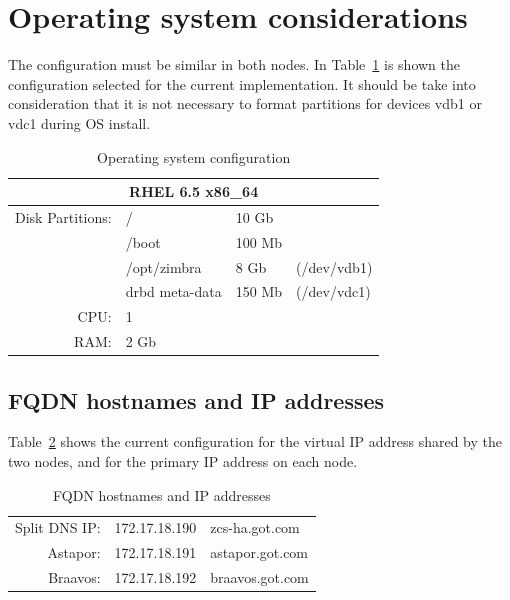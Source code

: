 \documentclass[a4paper, 12pt]{book}
\begin{document}
\section{Operating system considerations}
\label{sec:considerations}

The configuration must be similar in both nodes. In Table~\ref{table:os} is shown the configuration selected for the current implementation. It should be take into consideration that it is not necessary to format partitions for devices vdb1 or vdc1 during OS install.

\FloatBarrier
\begin{table}[H]
  \centering
  \begin{tabular}{ | r l l l | }
  
    \hline    
    \multicolumn{4}{|c|}{\textbf{RHEL 6.5 x86\_64}}\\
    \hline
    Disk Partitions: & /              & 10 Gb  & \\
                     & /boot          & 100 Mb & \\
                     & /opt/zimbra    & 8 Gb   & (/dev/vdb1)\\
                     & drbd meta-data & 150 Mb & (/dev/vdc1)\\
    CPU:             & 1              &        & \\
    RAM:			 & 2 Gb 		  &        & \\
    \hline
  \end{tabular}
\caption{Operating system configuration}
\label{table:os}
\end{table}


\subsection{FQDN hostnames and IP addresses}
\label{sec:fqdn}

Table~\ref{table:fqdn} shows the current configuration for the virtual IP address shared by the two nodes, and for the primary IP address on each node.

\FloatBarrier
\begin{table}[H]
  \centering
  \begin{tabular}{ | r c l | }
    \hline    
    Split DNS IP: & 172.17.18.190 & zcs-ha.got.com \\
	Astapor:      & 172.17.18.191 & astapor.got.com \\
	Braavos:      & 172.17.18.192 & braavos.got.com \\
    \hline
  \end{tabular}
\caption{FQDN hostnames and IP addresses}
\label{table:fqdn}
\end{table}
\end{document}
